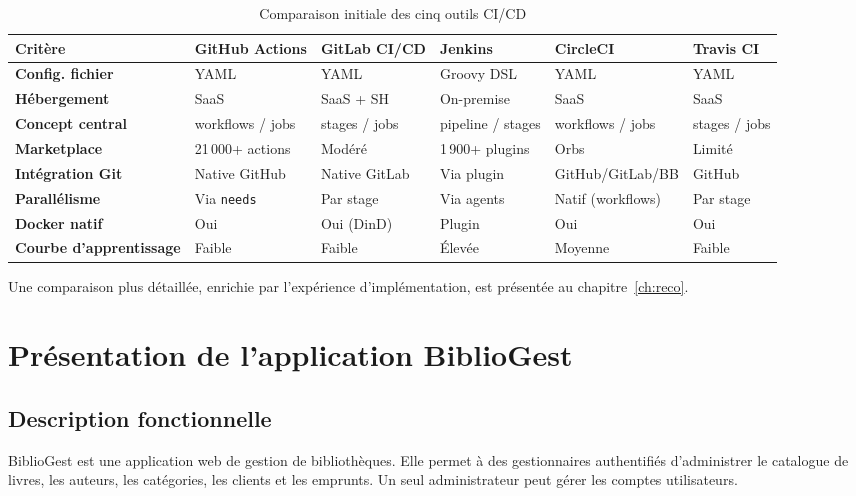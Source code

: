 \documentclass[12pt,a4paper]{report}
\begin{document}
\begin{table}[h!]
\centering
\small
\renewcommand{\arraystretch}{1.4}
\begin{tabular}{>{\bfseries}p{3cm} p{2.1cm} p{2.1cm} p{2.1cm} p{2.1cm} p{2.1cm}}
\toprule
Critère & GitHub Actions & GitLab CI/CD & Jenkins & CircleCI & Travis CI \\
\midrule
Config. fichier        & YAML & YAML & Groovy DSL & YAML & YAML \\
Hébergement            & SaaS & SaaS + SH & On-premise & SaaS & SaaS \\
Concept central        & workflows / jobs & stages / jobs & pipeline / stages & workflows / jobs & stages / jobs \\
Marketplace            & 21\,000+ actions & Modéré & 1\,900+ plugins & Orbs & Limité \\
Intégration Git        & Native GitHub & Native GitLab & Via plugin & GitHub/GitLab/BB & GitHub \\
Parallélisme           & Via \texttt{needs} & Par stage & Via agents & Natif (workflows) & Par stage \\
Docker natif           & Oui & Oui (DinD) & Plugin & Oui & Oui \\
Courbe d'apprentissage & Faible & Faible & Élevée & Moyenne & Faible \\
\bottomrule
\end{tabular}
\caption{Comparaison initiale des cinq outils CI/CD}
\label{tab:initial-comparison}
\end{table}

Une comparaison plus détaillée, enrichie par l'expérience d'implémentation,
est présentée au chapitre~\ref{ch:reco}.

\chapter{Présentation de l'application BiblioGest}
\label{ch:app}

\section{Description fonctionnelle}

BiblioGest est une application web de gestion de bibliothèques. Elle permet à
des gestionnaires authentifiés d'administrer le catalogue de livres, les
auteurs, les catégories, les clients et les emprunts. Un seul administrateur
peut gérer les comptes utilisateurs.
\end{document}
